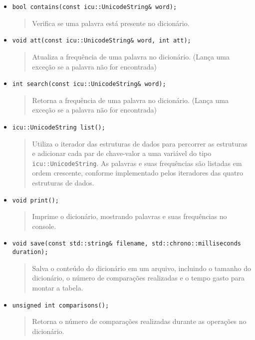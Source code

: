\documentclass{article}
\begin{document}
\begin{itemize}
    \item \texttt{bool contains(const icu::UnicodeString\& word);}
    \begin{quote}
        Verifica se uma palavra está presente no dicionário.
    \end{quote}

    \item \texttt{void att(const icu::UnicodeString\& word, int att);}
    \begin{quote}
        Atualiza a frequência de uma palavra no dicionário. (Lança uma exceção se a palavra não for encontrada)
    \end{quote}

    \item \texttt{int search(const icu::UnicodeString\& word);}
    \begin{quote}
        Retorna a frequência de uma palavra no dicionário. (Lança uma exceção se a palavra não for encontrada)
    \end{quote}

    \item \texttt{icu::UnicodeString list();}
    \begin{quote}
        Utiliza o iterador das estruturas de dados para percorrer as estruturas e adicionar cada par de chave-valor a uma variável do tipo \texttt{icu::UnicodeString}. As palavras e suas frequências são listadas em ordem crescente, conforme implementado pelos iteradores das quatro estruturas de dados.
    \end{quote}

    \item \texttt{void print();}
    \begin{quote}
        Imprime o dicionário, mostrando palavras e suas frequências no console.
    \end{quote}

    \item \texttt{void save(const std::string\& filename, std::chrono::milliseconds duration);}
    \begin{quote}
        Salva o conteúdo do dicionário em um arquivo, incluindo o tamanho do dicionário, o número de comparações realizadas e o tempo gasto para montar a tabela.
    \end{quote}

    \item \texttt{unsigned int comparisons();}
    \begin{quote}
        Retorna o número de comparações realizadas durante as operações no dicionário.
    \end{quote}
\end{itemize}
\end{document}
